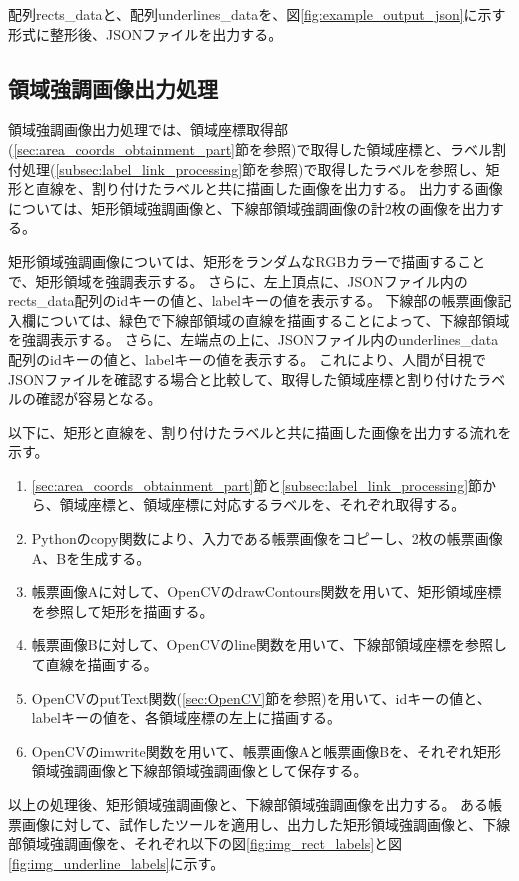 配列rects\_dataと、配列underlines\_dataを、図\ref{fig:example_output_json}に示す形式に整形後、JSONファイルを出力する。

\subsection{領域強調画像出力処理}\label{subsec:area_highlighted_image_output_processing}
領域強調画像出力処理では、領域座標取得部(\ref{sec:area_coords_obtainment_part}節を参照)で取得した領域座標と、ラベル割付処理(\ref{subsec:label_link_processing}節を参照)で取得したラベルを参照し、矩形と直線を、割り付けたラベルと共に描画した画像を出力する。
出力する画像については、矩形領域強調画像と、下線部領域強調画像の計2枚の画像を出力する。

矩形領域強調画像については、矩形をランダムなRGBカラーで描画することで、矩形領域を強調表示する。
さらに、左上頂点に、JSONファイル内のrects\_data配列のidキーの値と、labelキーの値を表示する。
下線部の帳票画像記入欄については、緑色で下線部領域の直線を描画することによって、下線部領域を強調表示する。
さらに、左端点の上に、JSONファイル内のunderlines\_data配列のidキーの値と、labelキーの値を表示する。
これにより、人間が目視でJSONファイルを確認する場合と比較して、取得した領域座標と割り付けたラベルの確認が容易となる。

以下に、矩形と直線を、割り付けたラベルと共に描画した画像を出力する流れを示す。

\begin{enumerate}
    \item \ref{sec:area_coords_obtainment_part}節と\ref{subsec:label_link_processing}節から、領域座標と、領域座標に対応するラベルを、それぞれ取得する。
    \item Pythonのcopy関数により、入力である帳票画像をコピーし、2枚の帳票画像A、Bを生成する。
    \item 帳票画像Aに対して、OpenCVのdrawContours関数を用いて、矩形領域座標を参照して矩形を描画する。
    \item 帳票画像Bに対して、OpenCVのline関数を用いて、下線部領域座標を参照して直線を描画する。
    \item OpenCVのputText関数(\ref{sec:OpenCV}節を参照)を用いて、idキーの値と、labelキーの値を、各領域座標の左上に描画する。
    \item OpenCVのimwrite関数を用いて、帳票画像Aと帳票画像Bを、それぞれ矩形領域強調画像と下線部領域強調画像として保存する。
\end{enumerate}

以上の処理後、矩形領域強調画像と、下線部領域強調画像を出力する。
ある帳票画像に対して、試作したツールを適用し、出力した矩形領域強調画像と、下線部領域強調画像を、それぞれ以下の図\ref{fig:img_rect_labels}と図\ref{fig:img_underline_labels}に示す。

